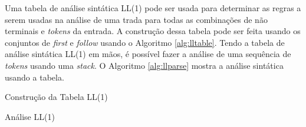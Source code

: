 Uma tabela de análise sintática LL(1) pode ser usada para determinar as regras a serem usadas na análise de uma trada para todas as combinações de não terminais e \textit{tokens} da entrada. A construção dessa tabela pode ser feita usando os conjuntos de \textit{first} e \textit{follow} usando o Algoritmo \ref{alg:lltable}. Tendo a tabela de análise sintática LL(1) em mãos, é possível fazer a análise de uma sequência de \textit{tokens} usando uma \textit{stack}. O Algoritmo \ref{alg:llparse} mostra a análise sintática usando a tabela.

\begin{algorithm}[htp]
    \caption{Construção da Tabela LL(1)}\label{alg:lltable}
\end{algorithm}
\begin{algorithm}[htp]
    \caption{Análise LL(1)}\label{alg:llparse}
\end{algorithm}

